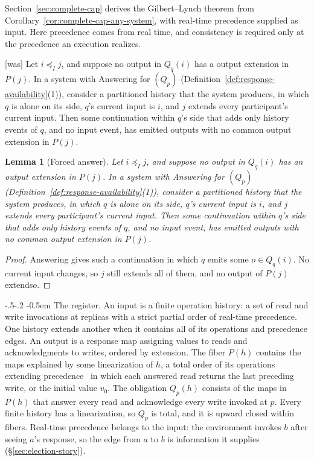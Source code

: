 \documentclass[sigconf]{cidr-2027}
\makeatletter
\newtheorem{lemma}{Lemma}
\theoremstyle{remark}
\renewcommand\paragraph{\@startsection{paragraph}{4}{\z@}%
  {-.5\baselineskip \@plus -2\p@ \@minus -.2\p@}%
  {-0.5em}%
  {\normalfont\bfseries}}
\newcommand{\InputOrd}{\preceq_I}
\newcommand{\inrel}{extends\xspace}          %
\newcommand{\outrel}{extends\xspace}          %
\newcommand{\outnoun}{output extension\xspace}%
\newcommand{\fiber}[1]{P(#1)}
\makeatother
\begin{document}
Section~\ref{sec:complete-cap} derives the Gilbert--Lynch theorem from
Corollary~\ref{cor:complete-cap-any-system}, with real-time precedence supplied
as input.  Here precedence comes from real time, and consistency is required
only at the precedence an execution realizes.



{\footnotesize\color{black!50}\noindent\textsf{[was]} Let $i\InputOrd j$, and suppose no output in $Q_q(i)$ has a \outnoun in
$\fiber{j}$.  In a system with Answering for $(Q_p)$
(Definition~\ref{def:response-availability}(1)), consider a partitioned
history that the system produces, in which $q$ is alone on its side,
$q$'s current input is $i$, and $j$ \inrel every participant's current input.
Then some continuation within $q$'s side that adds only history events of $q$,
and no input event, has emitted outputs with no common \outnoun in
$\fiber{j}$.\par}

\color{blue!70!black}\begin{lemma}[Forced answer]
\label{lem:forced-answer}
Let $i\InputOrd j$, and suppose no output in $Q_q(i)$ has an \outnoun in
$\fiber{j}$.  In a system with Answering for $(Q_p)$
(Definition~\ref{def:response-availability}(1)), consider a partitioned
history that the system produces, in which $q$ is alone on its side,
$q$'s current input is $i$, and $j$ \inrel every participant's current input.
Then some continuation within $q$'s side that adds only history events of $q$,
and no input event, has emitted outputs with no common \outnoun in
$\fiber{j}$.\color{black}
\end{lemma}

\begin{proof}
Answering gives such a continuation in which $q$ emits some $o\in Q_q(i)$.  No
current input changes, so $j$ still \inrel all of them, and no output of
$\fiber{j}$ \outrel $o$.
\end{proof}

\paragraph{The register.}
An input is a finite operation history: a set of read and write invocations at
replicas with a strict partial order of real-time precedence.  One history
\inrel another when it contains all of its operations and precedence edges.
An output is a response map assigning values to reads and acknowledgments to
writes, ordered by extension.  The fiber $\fiber{h}$ contains the maps
explained by some linearization of $h$, a total order of its operations
extending precedence~\cite{herlihy1990linearizability} in which each answered
read returns the last preceding write, or the initial value $v_0$.  The
obligation $Q_p(h)$ consists of the maps in $\fiber{h}$ that answer every read
and acknowledge every write invoked at $p$.  Every finite history has a
linearization, so $Q_p$ is total, and it is upward closed within fibers.
Real-time precedence belongs to the input: the environment invokes $b$ after
seeing $a$'s response, so the edge from $a$ to $b$ is information it supplies
(\S\ref{sec:election-story}).
\end{document}
